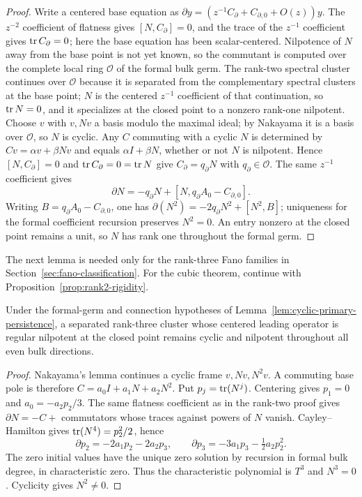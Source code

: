 \begin{proof}
Write a centered base equation as
\(\partial y=(z^{-1}C_\partial+C_{\partial,0}+O(z))y\).  The
\(z^{-2}\) coefficient of flatness gives \([N,C_\partial]=0\), and the trace
of the \(z^{-1}\) coefficient gives \(\operatorname{tr} C_\partial=0\); here the base
equation has been scalar-centered.  Nilpotence of \(N\) away from the
base point is not yet known, so the commutant is computed over the
complete local ring \(\mathcal O\) of the formal bulk germ.  The rank-two
spectral cluster continues over \(\mathcal O\) because it is separated
from the complementary spectral clusters at the base point; \(N\) is the centered
\(z^{-1}\) coefficient of that continuation, so \(\operatorname{tr} N=0\), and it
specializes at the closed point to a nonzero rank-one nilpotent.  Choose
\(v\) with \(v,Nv\) a basis modulo the maximal ideal; by Nakayama it is a
basis over \(\mathcal O\), so \(N\) is cyclic.  Any \(C\) commuting with a
cyclic \(N\) is determined by \(Cv=\alpha v+\beta Nv\) and equals
\(\alpha I+\beta N\), whether or not \(N\) is nilpotent.  Hence
\([N,C_\partial]=0\) and \(\operatorname{tr} C_\partial=0=\operatorname{tr} N\) give
\(C_\partial=q_\partial N\) with \(q_\partial\in\mathcal O\).  The same
\(z^{-1}\) coefficient gives
\[
 \partial N=-q_\partial N+
 [N,q_\partial A_0-C_{\partial,0}].
\]
Writing \(B=q_\partial A_0-C_{\partial,0}\), one has
\(\partial(N^2)=-2q_\partial N^2+[N^2,B]\); uniqueness for the formal
coefficient recursion preserves \(N^2=0\).  An entry nonzero at the closed
point remains a unit, so \(N\) has rank one throughout the formal germ.
%
\end{proof}

The next lemma is needed only for the rank-three Fano families in
Section~\ref{sec:fano-classification}. For the cubic theorem, continue with
Proposition~\ref{prop:rank2-rigidity}.

\begin{lemma}
\label{lem:triple-primary-persistence}%
Under the formal-germ and connection hypotheses of
Lemma~\ref{lem:cyclic-primary-persistence}, a separated rank-three cluster
whose centered leading operator is regular nilpotent at the closed point
remains cyclic and nilpotent throughout all even bulk directions.
\end{lemma}
\begin{proof}
Nakayama's lemma continues a cyclic frame $v,Nv,N^2v$. A commuting base
pole is therefore $C=a_0I+a_1N+a_2N^2$. Put $p_j=\operatorname{tr}(N^j)$.
Centering gives $p_1=0$ and $a_0=-a_2p_2/3$.
The same flatness coefficient as in the rank-two proof gives
$\partial N=-C+$ commutators whose traces against powers of $N$ vanish.
Cayley--Hamilton gives $\operatorname{tr}(N^4)=p_2^2/2$, hence
\[
 \partial p_2=-2a_1p_2-2a_2p_3,\qquad
 \partial p_3=-3a_1p_3-\tfrac12a_2p_2^2.
\]
The zero initial values have the unique zero solution by recursion in
formal bulk degree, in characteristic zero. Thus the characteristic
polynomial is $T^3$ and $N^3=0$. Cyclicity gives $N^2\ne0$.
%
\end{proof}

